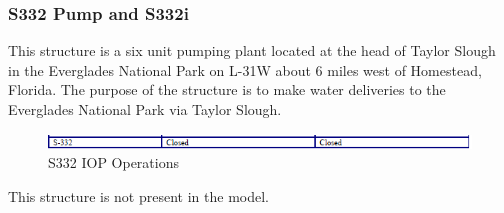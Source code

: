 \subsubsection{S332 Pump and S332i}
This structure is a six unit pumping plant located at the head of Taylor Slough in the Everglades National Park on L-31W about 6 miles west of Homestead, Florida. The purpose of the structure is to make water deliveries to the Everglades National Park via Taylor Slough.

\begin{figure}[!h]
  \begin{center}
  \includegraphics[width=6.5in]{../figs/S332_IOPops.png}
  \caption{S332 IOP Operations}
  \label{fig:S332iop}
  \end{center}
\end{figure}

This structure is not present in the model.

%
%
%


